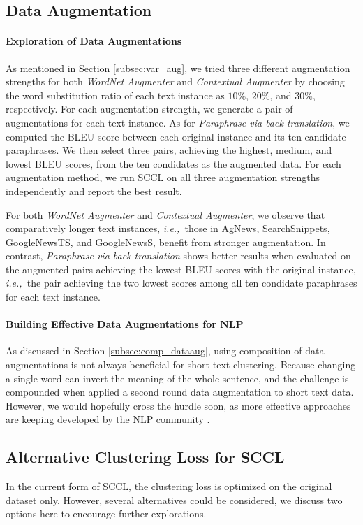 \documentclass[11pt]{article}
\def\ie{{\em i.e.,~}}
\begin{document}
\subsection{Data Augmentation}
\label{appendix:var_aug}
\paragraph{Exploration of Data Augmentations}
As mentioned in Section \ref{subsec:var_aug}, we tried three different augmentation strengths for both \textit{WordNet Augmenter} and \textit{Contextual Augmenter} by choosing the word substitution ratio of each text instance as $10\%$, $20\%$, and $30\%$, respectively. For each augmentation strength, we generate a pair of augmentations for each text instance. As for \textit{Paraphrase via back translation}, we computed the BLEU score between each original instance and its ten candidate paraphrases. We then select three pairs, achieving the highest, medium, and lowest BLEU scores, from the ten condidates as the augmented data. For each augmentation  method, we run SCCL on all three augmentation strengths independently and report the best result. 

For both \textit{WordNet Augmenter} and \textit{Contextual Augmenter}, we observe that comparatively longer text instances, \ie those in AgNews, SearchSnippets, GoogleNewsTS, and GoogleNewsS, benefit from stronger augmentation. 
In contrast, \textit{Paraphrase via back translation} shows better results when evaluated on the augmented pairs achieving the lowest BLEU scores with the original instance, \ie the pair achieving the two lowest scores among all ten condidate paraphrases for each text instance. 

\paragraph{Building Effective Data Augmentations for NLP} As discussed in Section \ref{subsec:comp_dataaug}, using composition of data augmentations is not always beneficial for short text clustering. Because changing a single word can invert the meaning of the whole sentence, and the challenge is compounded when applied a second round data augmentation to short text data. However, we would hopefully cross the hurdle soon, as more effective approaches are keeping developed by the NLP community \citet{qu2020coda, giorgi2020declutr, meng2021coco}.

\subsection{Alternative Clustering Loss for SCCL}
\label{appendix_cluster}
In the current form of SCCL, the clustering loss is optimized on the original dataset only. However, several alternatives could be considered, we discuss two options here to encourage further explorations. 
\end{document}
